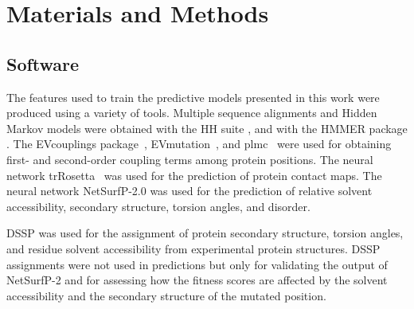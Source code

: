 \cleardoublepage%
\chapter{Materials and Methods}

\section{Software}
The features used to train the predictive models presented in this work were produced using a variety of tools.
Multiple sequence alignments and Hidden Markov models were obtained with the HH suite \parencite[version 3.3.0]{Steinegger2019}, and with the HMMER package \parencite[version 3.3.2]{Eddy2011}.
The EVcouplings package~\parencite[version 0.1.1]{Hopf2018}, EVmutation~\parencite[installed as part of EVcouplings]{Hopf2017}, and plmc~\parencite[installed from \url{https://github.com/debbiemarkslab/plmc} in March 2021]{Hopf2017} were used for obtaining first- and second-order coupling terms among protein positions.
The neural network trRosetta~\parencite[installed from \url{https://github.com/gjoni/trRosetta} in March 2021 and using the trained model \texttt{2019\_07}]{Yang2020} was used for the prediction of protein contact maps.
The neural network NetSurfP-2.0 \parencite{Klausen2019} was used for the prediction of relative solvent accessibility, secondary structure, torsion angles, and disorder.

DSSP \parencite[Define Secondary Structure of Protein,][version 3.1.2]{Kabsch1983} was used for the assignment of protein secondary structure, torsion angles, and residue solvent accessibility from experimental protein structures.
DSSP assignments were not used in predictions but only for validating the output of NetSurfP-2 and for assessing how the fitness scores are affected by the solvent accessibility and the secondary structure of the mutated position.

